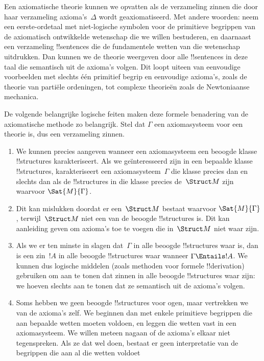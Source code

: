 \documentclass[../../../include/open-logic-section]{subfiles}
\begin{document}
\begin{explain}
Een axiomatische theorie kunnen we opvatten als de verzameling zinnen
die door haar verzameling axioma's~$\Delta$ wordt geaxiomatiseerd. Met
andere woorden: neem een eerste-ordetaal met niet-logische symbolen
voor de primitieve begrippen van de axiomatisch ontwikkelde wetenschap
die we willen bestuderen, en daarnaast een verzameling !!{sentence}s
die de fundamentele wetten van die wetenschap uitdrukken. Dan kunnen
we de theorie weergeven door alle !!{sentence}s in deze taal die
semantisch uit de axioma's volgen. Dit loopt uiteen van eenvoudige
voorbeelden met slechts één primitief begrip en eenvoudige axioma's,
zoals de theorie van partiële ordeningen, tot complexe theorieën zoals
de Newtoniaanse mechanica.

De volgende belangrijke logische feiten maken deze formele benadering
van de axiomatische methode zo belangrijk. Stel dat $\Gamma$ een
axiomasysteem voor een theorie is, dus een verzameling zinnen.
\begin{enumerate}
\item We kunnen precies aangeven wanneer een axiomasysteem een beoogde
  klasse !!{structure}s karakteriseert. Als we geïnteresseerd zijn in
  een bepaalde klasse !!{structure}s, karakteriseert een
  axiomasysteem~$\Gamma$ die klasse precies dan en slechts dan als de
  !!{structure}s in die klasse precies de~$\Struct M$ zijn waarvoor
  $\Sat{M}{\Gamma}$.
\item Dit kan mislukken doordat er een~$\Struct M$ bestaat waarvoor
  $\Sat{M}{\Gamma}$, terwijl~$\Struct M$ niet een van de beoogde
  !!{structure}s is. Dit kan aanleiding geven om axioma's toe te
  voegen die in~$\Struct M$ niet waar zijn.
\item Als we er ten minste in slagen dat~$\Gamma$ in alle beoogde
  !!{structure}s waar is, dan is een zin~$!A$ in alle beoogde
  !!{structure}s waar wanneer $\Gamma \Entails !A$. We kunnen dus
  logische middelen (zoals methoden voor formele !!{derivation})
  gebruiken om aan te tonen dat zinnen in alle beoogde !!{structure}s
  waar zijn: we hoeven slechts aan te tonen dat ze semantisch uit de
  axioma's volgen.
\item Soms hebben we geen beoogde !!{structure}s voor ogen, maar
  vertrekken we van de axioma's zelf. We beginnen dan met enkele
  primitieve begrippen die aan bepaalde wetten moeten voldoen, en
  leggen die wetten vast in een axiomasysteem. We willen meteen nagaan
  of de axioma's elkaar niet tegenspreken. Als ze dat wel doen, bestaat
  er geen interpretatie van de begrippen die aan al die wetten voldoet

\end{enumerate}
\end{explain}
\end{document}
